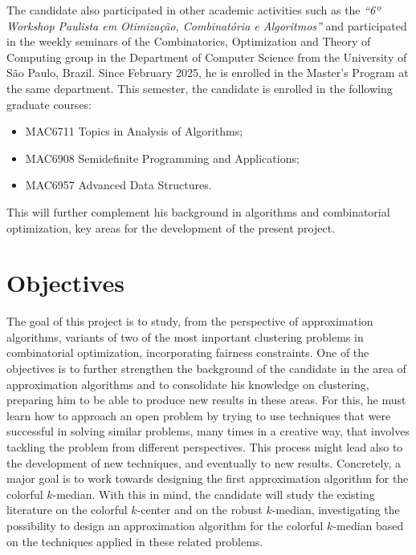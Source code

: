 \documentclass[12pt]{article}
\begin{document}
The candidate also participated in other academic activities such as the \emph{``6º Workshop Paulista em Otimização, Combinatória e Algoritmos''} and participated in the weekly seminars of the Combinatorics, Optimization and Theory of Computing group in the Department of Computer Science from the University of São Paulo, Brazil.
Since February 2025, he is enrolled in the Master's Program at the same department.
This semester, the candidate is enrolled in the following graduate courses: 
\begin{itemize} 
  \item MAC6711 Topics in Analysis of Algorithms;
  \item MAC6908 Semidefinite Programming and Applications;
  \item MAC6957 Advanced Data Structures.
\end{itemize}
This will further complement his background in algorithms and combinatorial optimization, key areas for the development of the present project.  


\section{Objectives}


The goal of this project is to study, from the perspective of approximation algorithms, variants of two of 
the most important clustering problems in combinatorial optimization, incorporating fairness constraints.
One of the objectives is to further strengthen the background of the candidate in the area of approximation algorithms
and to consolidate his knowledge on clustering, preparing him to be able to produce new results in these areas.  
For this, he must learn how to approach an open problem by trying to use techniques that were successful in solving 
similar problems, many times in a creative way, that involves tackling the problem from different perspectives.  
This process might lead also to the development of new techniques, and eventually to new results. 
Concretely, a major goal is to work towards designing the first approximation algorithm for the colorful $k$-median. 
With this in mind, the candidate will study the existing literature on the colorful $k$-center and on the robust $k$-median, 
investigating the possibility to design an approximation algorithm for the colorful $k$-median based 
on the techniques applied in these related problems.
\end{document}
